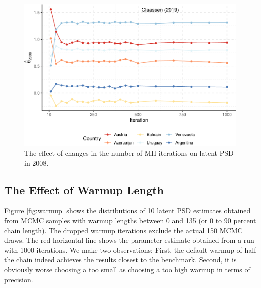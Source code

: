 \documentclass[12pt,english,a4paper,oneside]{article}
\theoremstyle{definition}
\theoremstyle{definition}
\theoremstyle{definition}
\theoremstyle{definition}
\theoremstyle{remark}
\begin{document}
\begin{figure}[H]
\includegraphics[width=\textwidth]{figs/niter-1} \caption[The effect of changes in the number of MH iterations on latent PSD in 2008]{The effect of changes in the number of MH iterations on latent PSD in 2008.}\label{fig:niter}
\end{figure}

\hypertarget{the-effect-of-warmup-length}{%
\subsection{The Effect of Warmup Length}\label{the-effect-of-warmup-length}}

Figure \ref{fig:warmup} shows the distributions of 10 latent PSD estimates obtained from MCMC samples with warmup lengths between 0 and 135 (or 0 to 90 percent chain length). The dropped warmup iterations exclude the actual 150 MCMC draws. The red horizontal line shows the parameter estimate obtained from a run with 1000 iterations. We make two observations: First, the default warmup of half the chain indeed achieves the results closest to the benchmark. Second, it is obviously worse choosing a too small as choosing a too high warmup in terms of precision.
\end{document}
